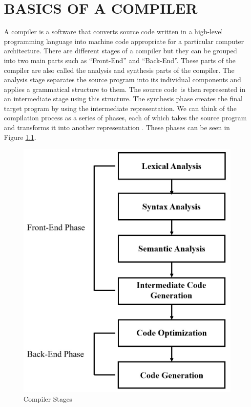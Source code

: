 \clearpage
\chapter{BASICS OF A COMPILER}\label{Ch2}
A compiler is a software that converts source code written in a high-level programming language into machine code appropriate for a particular computer architecture.
There are different stages of a compiler but they can be grouped into two main parts such as “Front-End” and “Back-End”. %
These parts of the compiler are also called the analysis and synthesis parts of the compiler. The analysis stage separates the source program into its individual components and applies a grammatical structure to them. The source code is then represented in an intermediate stage using this structure. The synthesis phase creates the final target program by using the intermediate representation. We can think of the compilation process as a series of phases, each of which takes the source program and transforms it into another representation \cite{compileralfredaho}. These phases can be seen in Figure \ref{fig:comp_stages}.
\begin{figure}
    \centering
    \includegraphics[scale=0.25]{basics_of_compiler/comp_stages.jpeg}
    \caption{Compiler Stages}
    \label{fig:comp_stages}
\end{figure}


